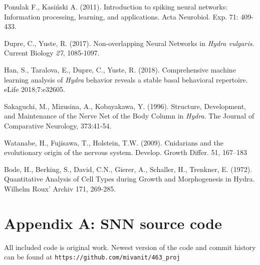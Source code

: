 \documentclass{article}
\begin{document}
\begin{thebibliography}{6}
    Ponulak F., Kasiński A. (2011).
    Introduction to spiking neural networks: Information processing, learning, and applications.
    Acta Neurobiol. Exp. 71: 409-433.
  
    Dupre, C., Yuste, R. (2017). Non-overlapping Neural Networks in \textit{Hydra vulgaris}. Current Biology \textit{27}, 1085-1097.
    
    Han, S., Taralova, E., Dupre, C., Yuste, R. (2018).
    Comprehensive machine learning analysis of \textit{Hydra} behavior reveals a stable basal behavioral repertoire.
    eLife 2018;7:e32605.
    
    Sakaguchi, M., Mizusina, A., Kobayakawa, Y. (1996).
    Structure, Development, and Maintenance of the Nerve Net of the Body Column in \textit{Hydra}.
    The Journal of Comparative Neurology, 373:41-54.
    
    Watanabe, H., Fujisawa, T., Holstein, T.W. (2009).
    Cnidarians and the evolutionary origin of the nervous system.
    Develop. Growth Differ. 51, 167–183
    
    Bode, H., Berking, S., David, C.N., Gierer, A., Schaller, H., Trenkner, E. (1972).
    Quantitative Analysis of Cell Types during Growth and Morphogenesis in Hydra.
    Wilhelm Roux' Archiv 171, 269-285.

\end{thebibliography}
\newpage

\section*{Appendix A: SNN source code}
All included code is original work. Newest version of the code and commit history can be found at \verb|https://github.com/mivanit/463_proj|
\end{document}
